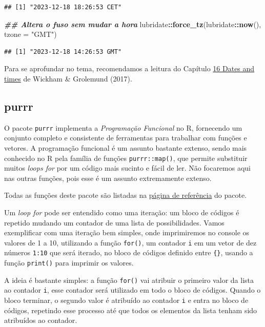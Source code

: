 \documentclass[
]{article}
\newenvironment{Shaded}{\begin{snugshade}}{\end{snugshade}}
\newcommand{\AttributeTok}[1]{\textcolor[rgb]{0.13,0.29,0.53}{#1}}
\newcommand{\DocumentationTok}[1]{\textcolor[rgb]{0.56,0.35,0.01}{\textbf{\textit{#1}}}}
\newcommand{\FunctionTok}[1]{\textcolor[rgb]{0.13,0.29,0.53}{\textbf{#1}}}
\newcommand{\NormalTok}[1]{#1}
\newcommand{\SpecialCharTok}[1]{\textcolor[rgb]{0.81,0.36,0.00}{\textbf{#1}}}
\newcommand{\StringTok}[1]{\textcolor[rgb]{0.31,0.60,0.02}{#1}}
\begin{document}
\begin{verbatim}
## [1] "2023-12-18 18:26:53 CET"
\end{verbatim}

\begin{Shaded}
\begin{Highlighting}[]
\DocumentationTok{\#\# Altera o fuso sem mudar a hora}
\NormalTok{lubridate}\SpecialCharTok{::}\FunctionTok{force\_tz}\NormalTok{(lubridate}\SpecialCharTok{::}\FunctionTok{now}\NormalTok{(), }\AttributeTok{tzone =} \StringTok{"GMT"}\NormalTok{)}
\end{Highlighting}
\end{Shaded}

\begin{verbatim}
## [1] "2023-12-18 14:26:53 GMT"
\end{verbatim}

Para se aprofundar no tema, recomendamos a leitura do Capítulo \href{https://r4ds.had.co.nz/dates-and-times.html}{16 Dates and times} de Wickham \& Grolemund (2017).

\hypertarget{purrr}{%
\subsection{purrr}\label{purrr}}

O pacote \texttt{purrr} implementa a \emph{Programação Funcional} no R, fornecendo um conjunto completo e consistente de ferramentas para trabalhar com funções e vetores. A programação funcional é um assunto bastante extenso, sendo mais conhecido no R pela família de funções \texttt{purrr::map()}, que permite substituir muitos \emph{loops for} por um código mais sucinto e fácil de ler. Não focaremos aqui nas outras funções, pois esse é um assunto extremamente extenso.

Todas as funções deste pacote são listadas na \href{https://purrr.tidyverse.org/reference/index.html}{página de referência} do pacote.

Um \emph{loop for} pode ser entendido como uma iteração: um bloco de códigos é repetido mudando um contador de uma lista de possibilidades. Vamos exemplificar com uma iteração bem simples, onde imprimiremos no console os valores de 1 a 10, utilizando a função \texttt{for()}, um contador \texttt{i} em um vetor de dez números \texttt{1:10} que será iterado, no bloco de códigos definido entre \texttt{\{\}}, usando a função \texttt{print()} para imprimir os valores.

A ideia é bastante simples: a função \texttt{for()} vai atribuir o primeiro valor da lista ao contador \texttt{i}, esse contador será utilizado em todo o bloco de códigos. Quando o bloco terminar, o segundo valor é atribuído ao contador \texttt{i} e entra no bloco de códigos, repetindo esse processo até que todos os elementos da lista tenham sido atribuídos ao contador.
\end{document}
